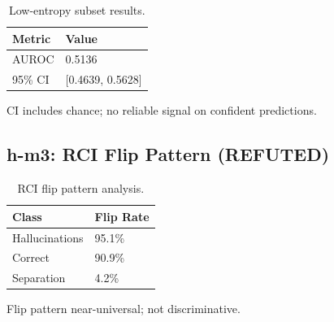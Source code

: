 \begin{table}[h]
\centering
\caption{Low-entropy subset results.}
\label{tab:hm2}
\begin{tabular}{@{}ll@{}}
\toprule
Metric & Value \\
\midrule
AUROC & 0.5136 \\
95\% CI & [0.4639, 0.5628] \\
\bottomrule
\end{tabular}
\end{table}

CI includes chance; no reliable signal on confident predictions.

\subsection{h-m3: RCI Flip Pattern (REFUTED)}

\begin{table}[h]
\centering
\caption{RCI flip pattern analysis.}
\label{tab:hm3}
\begin{tabular}{@{}ll@{}}
\toprule
Class & Flip Rate \\
\midrule
Hallucinations & 95.1\% \\
Correct & 90.9\% \\
Separation & 4.2\% \\
\bottomrule
\end{tabular}
\end{table}

Flip pattern near-universal; not discriminative.
